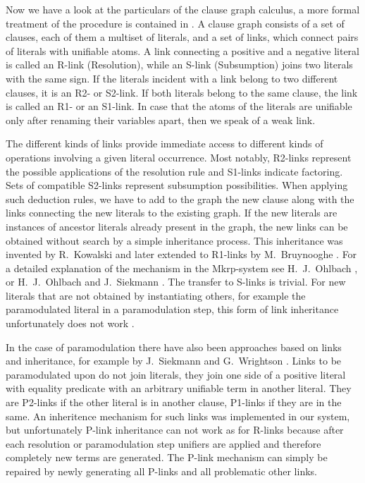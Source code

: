 Now we have a look at the particulars of the clause graph calculus, a
more formal treatment of the procedure is contained in
\cite{Raph84,OhSi89,Eisinger89,EiOhPr89}.  A clause graph consists of
a set of clauses, each of them a multiset of literals, and a set of
links, which connect pairs of literals with unifiable atoms. A link
connecting a positive and a negative literal is called an R-link
(Resolution), while an S-link (Subsumption) joins two
literals with the same sign. If the literals incident with a link
belong to two different clauses, it is an R2- or
S2-link. If both literals belong to the
same clause, the link is called an R1- or an
S1-link. In case that the atoms of the
literals are unifiable only after renaming their variables apart, then
we speak of a weak link.

The different kinds of links provide immediate access to different
kinds of operations involving a given literal occurrence. Most
notably, R2-links represent the possible applications of the
resolution rule and S1-links indicate factoring. Sets of compatible
S2-links represent subsumption possibilities. When applying such
deduction rules, we have to add to the graph the new clause along with
the links connecting the new literals to the existing graph. If the
new literals are instances of ancestor literals already present in the
graph, the new links can be obtained without search by a simple
inheritance process. This inheritance was invented by R.\ Kowalski
\cite{Kowalski75} and later extended to R1-links by M.\ Bruynooghe
\cite{Bruynooghe75}. For a detailed explanation of the mechanism in
the {\sc Mkrp}-system see H.\ J.\ Ohlbach \cite{Ohlbach87}, or H.\ J.\
Ohlbach and J.\ Siekmann \cite{OhSi89}.  The transfer to S-links is
trivial. For new literals that are not obtained by instantiating
others, for example the paramodulated literal in a paramodulation
step, this form of link inheritance unfortunately does not work
\cite{Blaesius86}.

In the case of paramodulation there have also been approaches based on
links and inheritance, for example by J.\ Siekmann and G.\ Wrightson
\cite{SiWr80}. Links to be paramodulated upon do not join literals,
they join one side of a positive literal with equality predicate with
an arbitrary unifiable term in another literal.  They are P2-links if
the other literal is in another clause,
P1-links if they are in
the same. An inheritence mechanism for such links was implemented in
our system, but unfortunately P-link inheritance can not work as for
R-links because after each resolution or paramodulation step unifiers
are applied and therefore completely new terms are generated. The
P-link mechanism can simply be repaired by newly generating all
P-links and all problematic other links.


